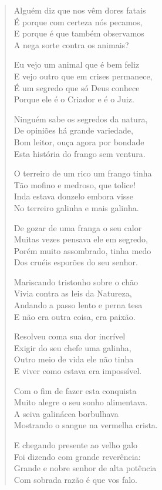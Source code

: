 \begin{verse}
Alguém diz que nos vêm dores fatais\\
É porque com certeza nós pecamos,\\
E porque é que também observamos\\
A nega sorte contra os animais?

Eu vejo um animal que é bem feliz\\
E vejo outro que em crises permanece,\\
É um segredo que só Deus conhece\\
Porque ele é o Criador e é o Juiz.

Ninguém sabe os segredos da natura,\\
De opiniões há grande variedade,\\
Bom leitor, ouça agora por bondade\\
Esta história do frango sem ventura.

O terreiro de um rico um frango tinha\\
Tão mofino e medroso, que tolice!\\
Inda estava donzelo embora visse\\
No terreiro galinha e mais galinha.

De gozar de uma franga o seu calor\\
Muitas vezes pensava ele em segredo,\\
Porém muito assombrado, tinha medo\\
Dos cruéis esporões do seu senhor.

Mariscando tristonho sobre o chão\\
Vivia contra as leis da Natureza,\\
Andando a passo lento e perna tesa\\
E não era outra coisa, era paixão.

Resolveu coma sua dor incrível\\
Exigir do seu chefe uma galinha,\\
Outro meio de vida ele não tinha\\
E viver como estava era impossível.

Com o fim de fazer esta conquista\\
Muito alegre o seu sonho alimentava.\\
A seiva galinácea borbulhava\\
Mostrando o sangue na vermelha crista.

E chegando presente ao velho galo\\
Foi dizendo com grande reverência:\\
Grande e nobre senhor de alta potência\\
Com sobrada razão é que vos falo.


\end{verse}
